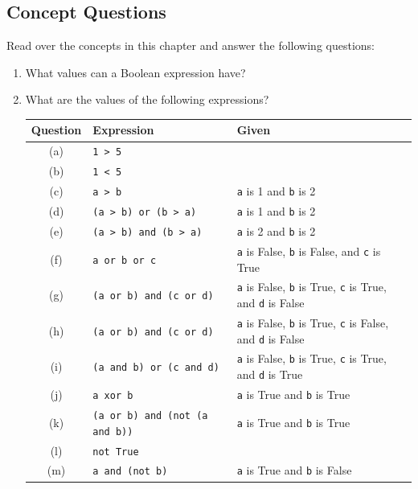 \subsection{Concept Questions} %
\label{sub:concept_questions_flow}

Read over the concepts in this chapter and answer the following questions:
\begin{enumerate}
  \item What values can a Boolean expression have?
  \item What are the values of the following expressions?
  
  \begin{table}[h]
    \centering
    \begin{tabular}{|c|l|l|}
      \hline
      \textbf{Question} & \textbf{Expression} & \textbf{Given} \\
      \hline
      (a) & \texttt{1 > 5} & \\
      \hline
      (b) & \texttt{1 < 5} & \\
      \hline
      (c) & \texttt{a > b} & \texttt{a} is 1 and \texttt{b} is 2 \\
      \hline
      (d) & \texttt{(a > b) or (b > a)} & \texttt{a} is 1 and \texttt{b} is 2 \\
      \hline
      (e) & \texttt{(a > b) and (b > a)} & \texttt{a} is 2 and \texttt{b} is 2 \\
      \hline
      (f) & \texttt{a or b or c} & \texttt{a} is False, \texttt{b} is False, and \texttt{c} is True\\
      \hline
      (g) & \texttt{(a or b) and (c or d)} & \texttt{a} is False, \texttt{b} is True, \texttt{c} is True, and \texttt{d} is False \\
      \hline
      (h) & \texttt{(a or b) and (c or d)} & \texttt{a} is False, \texttt{b} is True, \texttt{c} is False, and \texttt{d} is False \\
      \hline
      (i) & \texttt{(a and b) or (c and d)} & \texttt{a} is False, \texttt{b} is True, \texttt{c} is True, and \texttt{d} is True \\
      \hline
      (j) & \texttt{a xor b} & \texttt{a} is True and \texttt{b} is True\\
      \hline
      (k) & \texttt{(a or b) and (not (a and b))} & \texttt{a} is True and \texttt{b} is True\\
      \hline
      (l) & \texttt{not True} & \\
      \hline
      (m) & \texttt{a and (not b)} & \texttt{a} is True and \texttt{b} is False\\
      \hline
    \end{tabular}    
  \end{table}
  

\end{enumerate}
